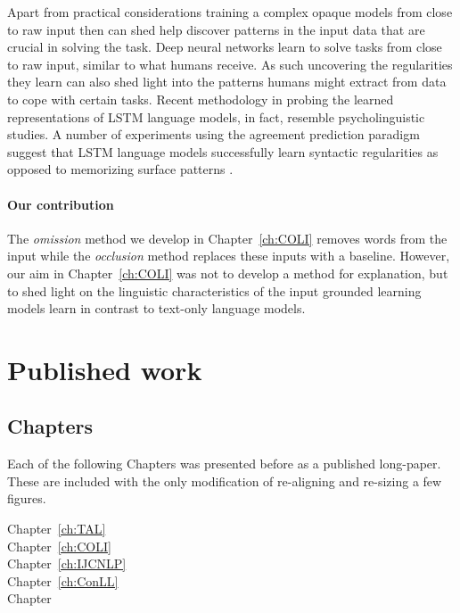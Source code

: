 Apart from practical considerations training a complex opaque models
from close to raw input then can shed help discover patterns in the
input data that are crucial in solving the task.
Deep neural networks learn to solve tasks from close to raw input, similar to
what humans receive. As such
uncovering the regularities they learn can also shed light into the patterns
humans might extract from data to cope with certain tasks.
Recent methodology in probing the learned representations of LSTM language models,
in fact, resemble psycholinguistic studies.
A number of experiments using the agreement prediction paradigm
\citep{bock1991broken} suggest that LSTM language models successfully learn
syntactic regularities as opposed to memorizing surface patterns
\citep{linzen2016assessing,enguehard2017exploring,bernardy2017using,gulordava2018colorless}.

\paragraph{Our contribution}
The \emph{omission} method we develop in Chapter~\ref{ch:COLI} removes words
from the input while the \emph{occlusion} \citep{li2016understanding}
method replaces these inputs with a baseline.
However, our aim in Chapter~\ref{ch:COLI} was not to develop a method for explanation, but to
shed light on the linguistic characteristics of the input grounded learning
models learn in contrast to text-only language models.

\section{Published work}

\subsection{Chapters}

Each of the following Chapters was presented before as a published long-paper. These are included with
the only modification of re-aligning and re-sizing a few figures.

\begin{description}
	\item[Chapter~\ref{ch:TAL}] 
	\item[Chapter~\ref{ch:COLI}] 
	\item[Chapter~\ref{ch:IJCNLP}] 
	\item[Chapter~\ref{ch:ConLL}] 
	\item[Chapter ] 
\end{description}

